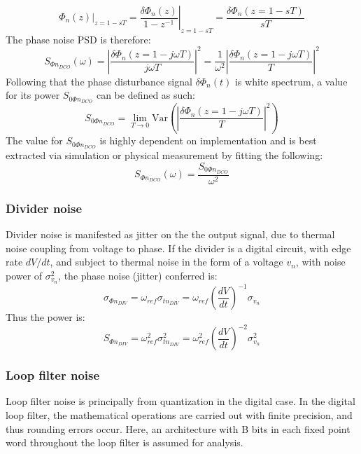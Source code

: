 \begin{equation}
\left.\Phi_{n}(z)\right\vert_{z=1-sT} = \left.\frac{\delta\Phi_n(z)}{1-z^{-1}}\right\vert_{z=1-sT} = \frac{\delta\Phi_n(z=1-sT)}{sT}
\end{equation}
The phase noise PSD is therefore:
\begin{equation}
S_{\Phi n_{DCO}}(\omega)= \left|\frac{\delta\Phi_n(z=1-j\omega T)}{j\omega T}\right|^2 = \frac{1}{\omega^2}\left|\frac{\delta\Phi_n(z=1-j\omega T)}{T}\right|^2
\end{equation}
Following that the phase disturbance signal $\delta\Phi_{n}(t)$ is white spectrum, a value for its power $S_{0\Phi n_{DCO}}$ can be defined as such:
\begin{equation}
S_{0\Phi n_{DCO}} = \lim_{T\to0} \mathrm{Var}\left( \left|\frac{\delta\Phi_n(z=1-j\omega T)}{T}\right|^2 \right)
\end{equation}
The value for $S_{0\Phi n_{DCO}}$ is highly dependent on implementation and is best extracted via simulation or physical measurement by fitting the following:
\begin{equation}
S_{\Phi n_{DCO}}(\omega)= \frac{S_{0\Phi n_{DCO}}}{\omega^2}
\end{equation}
\subsubsection{Divider noise}
Divider noise is manifested as jitter on the the output signal, due to thermal noise coupling from voltage to phase. If the divider is a digital circuit, with edge rate $dV/dt$, and subject to thermal noise in the form of a  voltage $v_n$, with noise power of $\sigma_{v_n}^2$, the phase noise (jitter) conferred is:
\begin{equation}
\sigma_{\Phi n_{DIV}} = \omega_{ref}\sigma_{t n_{DIV}}  =\omega_{ref}\left(\frac{dV}{dt}\right)^{-1}\sigma_{v_n}
\end{equation}
Thus the power is:
\begin{equation}
S_{\Phi n_{DIV}} = \omega^2_{ref}\sigma^2_{t n_{DIV}}  =\omega^2_{ref}\left(\frac{dV}{dt}\right)^{-2}\sigma_{v_n}^2
\end{equation}

\subsubsection{Loop filter noise}
Loop filter noise is principally from quantization in the digital case. In the digital loop filter, the mathematical operations are carried out with finite precision, and thus rounding errors occur. Here, an architecture with B bits in each fixed point word throughout the loop filter is assumed for analysis. 

